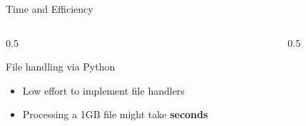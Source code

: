 \documentclass[aspectratio=169, xcolor=dvipsnames]{beamer}
\begin{document}
\begin{frame}{Time and Efficiency}
    \begin{columns}[T]
        \begin{column}{0.5\textwidth}
            \begin{alertblock}{File handling via Python}
                \begin{itemize}[<+->]
                    \item Low effort to implement file handlers
                    \item Processing a 1GB file might take \textbf{seconds}
                \end{itemize}
            \end{alertblock}
        \end{column}
        \begin{column}{0.5\textwidth}
        \end{column}
    \end{columns}
\end{frame}
\end{document}

